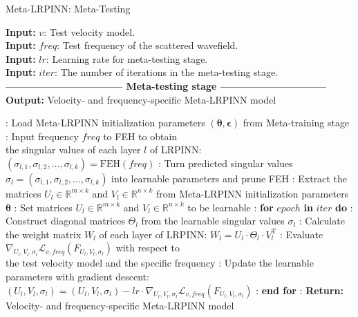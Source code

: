 \begin{algorithm}
\caption{Meta-LRPINN: Meta-Testing}\label{alg2}
\textbf{Input:} $v$: Test velocity model. \\
\textbf{Input:} $\textit{freq}$: Test frequency of the scattered wavefield. \\
\textbf{Input:} $lr$: Learning rate for meta-testing stage. \\
\textbf{Input:} ${iter}$: The number of iterations in the meta-testing stage. \\
\textbf{-------------------------------- Meta-testing stage -----------------------------} \\
\textbf{Output:} Velocity- and frequency-specific Meta-LRPINN model
\begin{algorithmic}
: Load Meta-LRPINN initialization parameters $(\boldsymbol{\theta}, \boldsymbol{\epsilon})$ from Meta-training stage
: Input frequency $\textit{freq}$ to FEH to obtain \\
\quad \quad \quad \quad the singular values of each layer $l$ of LRPINN: $(\sigma_{l,1}, \sigma_{l,2}, \dots, \sigma_{l,k}) = \text{FEH}(\textit{freq})$
: Turn predicted singular values $\sigma_{l} = (\sigma_{l,1}, \sigma_{l,2}, \dots, \sigma_{l,k})$ into learnable parameters and prune FEH
: Extract the matrices $U_l \in \mathbb{R}^{m \times k}$ and $V_l \in \mathbb{R}^{n \times k}$ from Meta-LRPINN initialization parameters $\boldsymbol{\theta}$ 
: Set matrices $U_l \in \mathbb{R}^{m \times k}$ and $V_l \in \mathbb{R}^{n \times k}$ to be learnable
: \textbf{for} ${epoch}$ \textbf{in} ${iter}$ \textbf{do}
: \quad \quad Construct diagonal matrices $\Theta_l$ from the learnable singular values $\sigma_{l}$
: \quad \quad Calculate the weight matrix $W_l$ of each layer of LRPINN: $W_l = U_l \cdot \Theta_l \cdot V_l^\text{T}$
: \quad \quad Evaluate $\nabla_{U_l, V_l, \sigma_{l}} \mathcal{L}_{v, \textit{freq}} \left( F_{U_l, V_l, \sigma_{l}} \right)$ with respect to \\
\quad \quad \quad \quad \quad \quad the test velocity model and the specific frequency
: \quad \quad Update the learnable parameters with gradient descent: \\
\quad \quad \quad \quad \quad \quad \quad \quad \quad $(U_l, V_l, \sigma_{l}) = (U_l, V_l, \sigma_{l}) - lr \cdot \nabla_{U_l, V_l, \sigma_{l}} \mathcal{L}_{v, \textit{freq}} \left( F_{U_l, V_l, \sigma_{l}} \right)$
: \textbf{end for}
: \textbf{Return:} Velocity- and frequency-specific Meta-LRPINN model
\end{algorithmic}
\end{algorithm}

